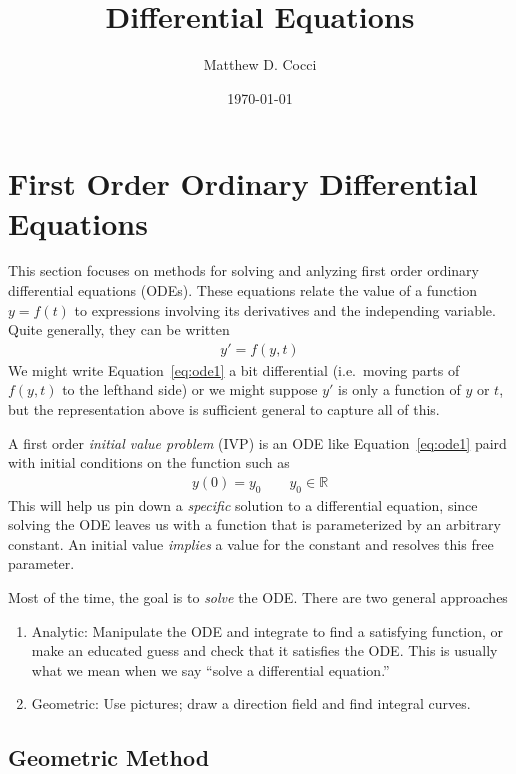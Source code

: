 \documentclass[12pt]{article}
\author{Matthew D. Cocci}
\title{Differential Equations}
\date{\today}
\theoremstyle{plain}
\theoremstyle{definition}
\theoremstyle{remark}
\begin{document}
\maketitle


\section{First Order Ordinary Differential Equations}

This section focuses on methods for solving and anlyzing first order
ordinary differential equations (ODEs). These equations relate the value
of a function $y = f(t)$ to expressions involving its derivatives and
the independing variable. Quite generally, they can be written
\begin{align}
  y' = f(y,t)
  \label{eq:ode1}
\end{align}
We might write Equation~\ref{eq:ode1} a bit differential (i.e.\ moving
parts of $f(y,t)$ to the lefthand side) or we might suppose $y'$ is only
a function of $y$ or $t$, but the representation above is sufficient
general to capture all of this.

A first order \emph{initial value problem} (IVP) is an ODE like
Equation~\ref{eq:ode1} paird with initial conditions on the function
such as
\begin{align*}
  y(0) = y_0
  \qquad
  y_0 \in \mathbb{R}
\end{align*}
This will help us pin down a \emph{specific} solution to a differential
equation, since solving the ODE leaves us with a function that is
parameterized by an arbitrary constant. An initial value \emph{implies}
a value for the constant and resolves this free parameter.

Most of the time, the goal is to \emph{solve} the ODE. There are two
general approaches
\begin{enumerate}
  \item Analytic: Manipulate the ODE and integrate to find a satisfying
    function, or make an educated guess and check that it satisfies the
    ODE. This is usually what we mean when we say ``solve a differential
    equation.''
  \item Geometric: Use pictures; draw a direction field and find
    integral curves.
\end{enumerate}

\subsection{Geometric Method}
\end{document}
